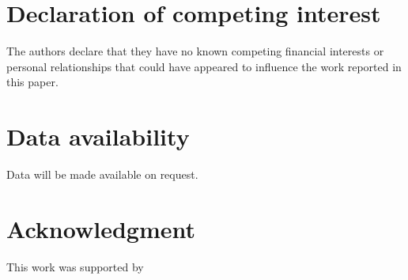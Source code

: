 \documentclass[12pt]{article}
\begin{document}
\section*{Declaration of competing interest}
The authors declare that they have no known competing financial interests or personal relationships that could have appeared to influence the work reported in this paper.

\section*{Data availability}
Data will be made available on request.

\section*{Acknowledgment}
This work was supported by


\end{document}
